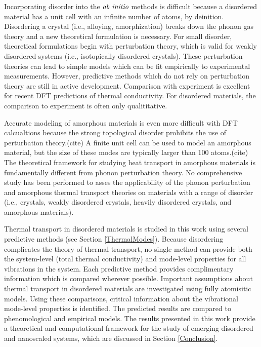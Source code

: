 Incorporating 
disorder into the $\emph{ab initio}$ methods is difficult because 
a disordered material has a unit cell with an infinite 
number of atoms, by deinition. 
Disordering a crystal (i.e., alloying, amorphization) 
breaks down the phonon gas theory and a new theoretical formulation 
is necessary.\cite{allen_thermal_1993,allen_diffusons_1999} 
For small disorder, theoretical formulations begin 
with perturbation theory, which is valid for weakly disordered systems 
(i.e., isotopically disordered crystals).
\cite{klemens_scattering_1955,abeles_lattice_1963,tamura_isotope_1983} 
These perturbation theories can lead to simple models which can be 
fit empirically to experimental measurements. However, predictive 
methods which do not rely on perturbation theory are still in active  
development.  
Comparison with experiment is excellent for recent 
DFT predictions of thermal conductivity. 
For disordered materials, the comparison to experiment is often 
only qualititative. 
\cite{shiomi_thermal_2011,tian_phonon_2012,tian_enhancing_2012}

Accurate modeling of amorphous materials is even more 
difficult with DFT calcualtions because the strong topological 
disorder prohibits the use of perturbation theory.(cite)  
A finite unit cell can be used to model an amorphous material, but 
the size of these modes are typically larger than 100 atoms.(cite) 
The theoretical framework for studying heat transport in 
amorphous materials is fundamentally different from 
phonon perturbation theory.
\cite{allen_thermal_1993,allen_diffusons_1999} No comprehensive 
study has been performed to asses the applicability of the 
phonon perturbation and amorphous thermal transport theories 
on materials with a range of disorder (i.e., crystals, 
weakly disordered crystals, heavily disordered crystals, 
and amorphous materials). 

Thermal transport in disordered materials is studied in this 
work using several predictive methods (see Section \ref{ThermalModes}). 
Because disordering complicates 
the theory of thermal transport, no single method can provide 
both the system-level (total thermal conductivity) and mode-level 
properties for all vibrations in the system. Each 
predictive method provides complimentary information which is 
compared wherever possible. Important 
assumptions about thermal transport in disordered 
materials are investigated using fully atomisitic models. 
Using these comparisons, critical information 
about the vibrational mode-level properties is identified.  
The predicted 
results are compared to phenomological and empirical 
models. The results presented in this work provide a theoretical and 
computational framework for the study of emerging disordered 
and nanoscaled systems, which are discussed in Section 
\ref{Conclusion}. 

